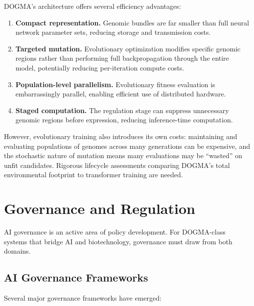 DOGMA's architecture offers several efficiency advantages:
\begin{enumerate}[leftmargin=1.8em]
  \item \textbf{Compact representation.} Genomic bundles are far smaller than full neural network parameter sets, reducing storage and transmission costs.
  \item \textbf{Targeted mutation.} Evolutionary optimization modifies specific genomic regions rather than performing full backpropagation through the entire model, potentially reducing per-iteration compute costs.
  \item \textbf{Population-level parallelism.} Evolutionary fitness evaluation is embarrassingly parallel, enabling efficient use of distributed hardware.
  \item \textbf{Staged computation.} The regulation stage can suppress unnecessary genomic regions before expression, reducing inference-time computation.
\end{enumerate}

However, evolutionary training also introduces its own costs: maintaining and evaluating populations of genomes across many generations can be expensive, and the stochastic nature of mutation means many evaluations may be ``wasted'' on unfit candidates.
Rigorous lifecycle assessments comparing DOGMA's total environmental footprint to transformer training are needed.

\section{Governance and Regulation}
\label{sec:governance}

AI governance is an active area of policy development.
For DOGMA-class systems that bridge AI and biotechnology, governance must draw from both domains.

\subsection{AI Governance Frameworks}

Several major governance frameworks have emerged:

